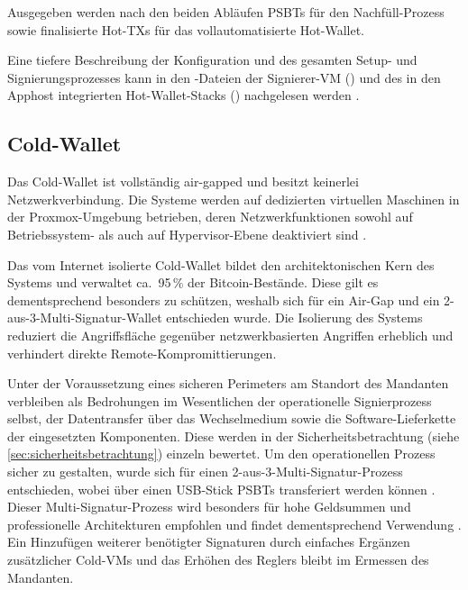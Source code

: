 Ausgegeben werden nach den beiden Abläufen \acp{PSBT} für den Nachfüll-Prozess sowie finalisierte Hot-\acp{TX} für das vollautomatisierte Hot-Wallet.

Eine tiefere Beschreibung der Konfiguration und des gesamten Setup- und Signierungsprozesses kann in den -Dateien der Signierer-\ac{VM} () und des in den Apphost integrierten Hot-Wallet-Stacks () nachgelesen werden \cite{NixOsHot_github, Krypto_Basis_github}.

\subsection{Cold-Wallet}

Das Cold-Wallet ist vollständig air-gapped und besitzt keinerlei Netzwerkverbindung. Die Systeme werden auf dedizierten virtuellen Maschinen in der Proxmox-Umgebung betrieben, deren Netzwerkfunktionen sowohl auf Betriebssystem- als auch auf Hypervisor-Ebene deaktiviert sind \cite{airgap_psbt_guide, Wallets}.

Das vom Internet isolierte Cold-Wallet bildet den architektonischen Kern des Systems und verwaltet ca.\ 95\,\% der Bitcoin-Bestände. Diese gilt es dementsprechend besonders zu schützen, weshalb sich für ein Air-Gap und ein 2-aus-3-Multi-Signatur-Wallet entschieden wurde. Die Isolierung des Systems reduziert die Angriffsfläche gegenüber netzwerkbasierten Angriffen erheblich und verhindert direkte Remote-Kompromittierungen.

Unter der Voraussetzung eines sicheren Perimeters am Standort des Mandanten verbleiben als Bedrohungen im Wesentlichen der operationelle Signierprozess selbst, der Datentransfer über das Wechselmedium sowie die Software-Lieferkette der eingesetzten Komponenten. Diese werden in der Sicherheitsbetrachtung
(siehe \ref{sec:sicherheitsbetrachtung}) einzeln bewertet.
Um den operationellen Prozess sicher zu gestalten, wurde sich für einen 2-aus-3-Multi-Signatur-Prozess entschieden, wobei über einen \ac{USB}-Stick \acp{PSBT} transferiert werden können \cite{riskpublishing_hotcold,bip174,Sparrow_Wallets_Best_Practices,knowingbitcoin_hotcold,psbt_dcentral,airgap_psbt_guide}.
Dieser Multi-Signatur-Prozess wird besonders für hohe Geldsummen und professionelle Architekturen empfohlen und findet dementsprechend Verwendung \cite{Sparrow_Wallets_Best_Practices}. Ein Hinzufügen weiterer benötigter Signaturen durch einfaches Ergänzen zusätzlicher Cold-\acp{VM} und das Erhöhen des Reglers bleibt im Ermessen des Mandanten.

